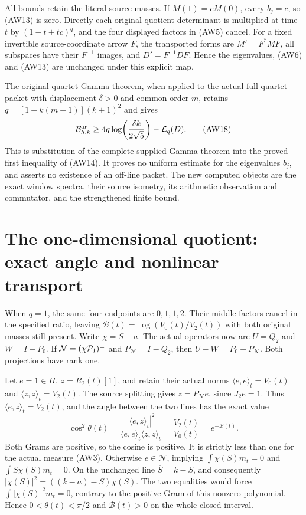 All bounds retain the literal source masses. If $M(1)=cM(0)$,
every $b_j=c$, so (AW13) is zero. Directly each original
quotient determinant is multiplied at time $t$ by
$(1-t+tc)^q$, and the four displayed factors in (AW5) cancel.
For a fixed invertible source-coordinate arrow $F$, the transported
forms are $M'=F^*MF$, all subspaces have their $F^{-1}$ images,
and $D'=F^{-1}DF$. Hence the eigenvalues, (AW6) and (AW13)
are unchanged under this explicit map.

The original quartet Gamma theorem, when applied to the actual
full quartet packet with displacement $\delta>0$ and common
order $m$, retains $q=[1+k(m-1)](k+1)^2$ and gives
\[
 \mathcal B^{\rm ar}_{h,k}
 \ge4q\log\!\left(\frac{\delta k}{2\sqrt5}\right)
             -\mathcal L_q(D).
 \tag{AW18}
\]
This is substitution of the complete supplied Gamma theorem
into the proved first inequality of (AW14). It proves no
uniform estimate for the eigenvalues $b_j$, and asserts no
existence of an off-line packet. The new computed objects are
the exact window spectra, their source isometry, its arithmetic
observation and commutator, and the strengthened finite bound.

\section{The one-dimensional quotient: exact angle and nonlinear transport}

When $q=1$, the same four endpoints are $0,1,1,2$. Their
middle factors cancel in the specified ratio, leaving
$\mathcal B(t)=\log(V_0(t)/V_2(t))$ with both original masses
still present. Write $\chi=S-a$. The actual operators now are
$U=Q_2$ and $W=I-P_0$. If $\mathcal N=(\chi\mathcal P_1)^\perp$
and $P_{\mathcal N}=I-Q_2$, then
$U-W=P_0-P_{\mathcal N}$. Both projections have rank one.

Let $e=1\in H$, $z=R_2(t)[1]$, and retain their actual norms
$\langle e,e\rangle_t=V_0(t)$ and
$\langle z,z\rangle_t=V_2(t)$. The source splitting gives
$z=P_{\mathcal N}e$, since $J_2e=1$. Thus
$\langle e,z\rangle_t=V_2(t)$, and the angle between the
two lines has the exact value
\[
 \cos^2\theta(t)=\frac{|\langle e,z\rangle_t|^2}
                         {\langle e,e\rangle_t\langle z,z\rangle_t}
       =\frac{V_2(t)}{V_0(t)}=e^{-\mathcal B(t)}.
 \tag{AW19}
\]
Both Grams are positive, so the cosine is positive. It is
strictly less than one for the actual measure (AW3).
Otherwise $e\in\mathcal N$, implying
$\int\chi(S)m_t=0$ and $\int S\chi(S)m_t=0$.
On the unchanged line $\overline S=k-S$, and consequently
$|\chi(S)|^2=((k-\overline a)-S)\chi(S)$.
The two equalities would force $\int|\chi(S)|^2m_t=0$,
contrary to the positive Gram of this nonzero polynomial.
Hence $0<\theta(t)<\pi/2$ and $\mathcal B(t)>0$ on the
whole closed interval.

